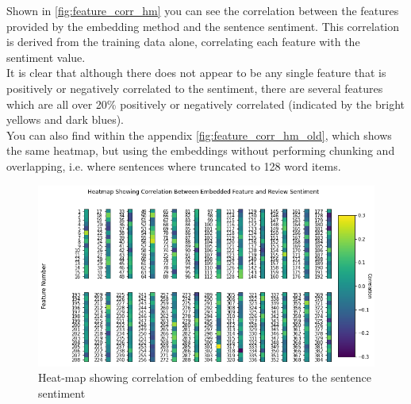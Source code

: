 Shown in \autoref{fig:feature_corr_hm} you can see the correlation between the features provided by the embedding method and the sentence sentiment. This correlation is derived from the training data alone, correlating each feature with the sentiment value.\\
It is clear that although there does not appear to be any single feature that is positively or negatively correlated to the sentiment, there are several features which are all over 20\% positively or negatively correlated (indicated by the bright yellows and dark blues).\\
You can also find within the appendix \autoref{fig:feature_corr_hm_old}, which shows the same heatmap, but using the embeddings without performing chunking and overlapping, i.e. where sentences where truncated to 128 word items.
\begin{figure}[h]
    \includegraphics[width=\textwidth]{figures/Feature_Correlation_Heatmap_Non_Trunkated_Embedding.png}
    \caption{\label{fig:feature_corr_hm} Heat-map showing correlation of embedding features to the sentence sentiment}
\end{figure}